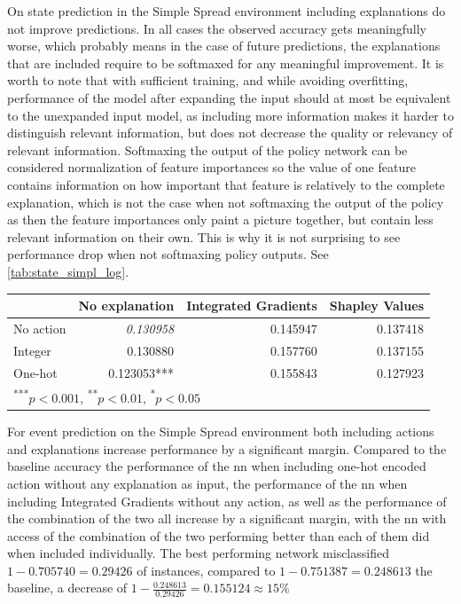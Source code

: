 \documentclass[UKenglish]{uiomasterthesis}
\begin{document}
On state prediction in the Simple Spread environment including explanations do not improve predictions. In all cases the observed accuracy gets meaningfully worse, which probably means in the case of future predictions, the explanations that are included require to be softmaxed for any meaningful improvement. It is worth to note that with sufficient training, and while avoiding overfitting, performance of the model after expanding the input should at most be equivalent to the unexpanded input model, as including more information makes it harder to distinguish relevant information, but does not decrease the quality or relevancy of relevant information. Softmaxing the output of the policy network can be considered normalization of feature importances so the value of one feature contains information on how important that feature is relatively to the complete explanation, which is not the case when not softmaxing the output of the policy as then the feature importances only paint a picture together, but contain less relevant information on their own. This is why it is not surprising to see performance drop when not softmaxing policy outputs. See \cref{tab:state_simpl_log}.

\begin{center}
\label{tab:state_simpl_log}
\begin{tabular}{lrrr}
\toprule
 & No explanation & Integrated Gradients & Shapley Values \\
\midrule
No action & \textit{0.130958} & 0.145947 & 0.137418 \\
Integer & 0.130880 & 0.157760 & 0.137155 \\
One-hot & 0.123053*** & 0.155843 & 0.127923 \\
\bottomrule
\multicolumn{3}{l}{\textsuperscript{***}$p<0.001$, 
  \textsuperscript{**}$p<0.01$, 
  \textsuperscript{*}$p<0.05$}
\end{tabular}
\end{center}

For event prediction on the Simple Spread environment both including actions and explanations increase performance by a significant margin. Compared to the baseline accuracy the performance of the \ac{nn} when including one-hot encoded action without any explanation as input, the performance of the \ac{nn} when including Integrated Gradients without any action, as well as the performance of the combination of the two all increase by a significant margin, with the \ac{nn} with access of the combination of the two performing better than each of them did when included individually. The best performing network misclassified $1-0.705740 = 0.29426$ of instances, compared to $1-0.751387 = 0.248613$ the baseline, a decrease of $1-\frac{0.248613}{0.29426} = 0.155124 \approx 15\%$
\end{document}

